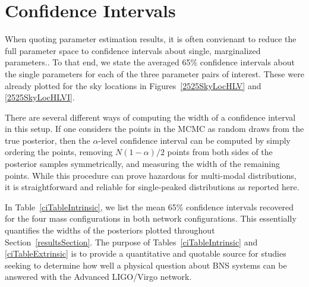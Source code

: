 \documentclass[11pt,a4paper]{emulateapj}
\newcommand{\carl}[1]{{\color{red}  #1}}
\begin{document}

\section{Confidence Intervals}
\label{ciSection}

When quoting parameter estimation results, it is often convienant to reduce the full parameter space to
confidence intervals about single, marginalized parameters..  To that end, we state the averaged 65\% 
confidence intervals about the single parameters for each of the three parameter pairs of interest.  These were already
 plotted for the sky locations in Figures~\ref{2525SkyLocHLV} and \ref{2525SkyLocHLVI}.  

There are several different ways of computing the width of a confidence interval in this setup.  If one considers the points in
 the MCMC as random draws from the true posterior, then the $\alpha$-level confidence interval can be computed by simply
  ordering the points, removing $N(1-\alpha )/2$ points from both sides of the posterior samples symmetrically, and measuring
   the width of the remaining points.  While this procedure can prove hazardous for multi-modal distributions, it is 
   straightforward and reliable for single-peaked distributions as reported here.

In Table~\ref{ciTableIntrinsic}, we list the mean 65\% confidence intervals recovered for the four mass configurations in both 
network configurations. This essentially quantifies the widths of the posteriors plotted throughout Section~\ref{resultsSection}.
  The purpose of Tables~\ref{ciTableIntrinsic} and \ref{ciTableExtrinsic} is to provide a quantitative and quotable source for studies seeking to determine how 
  well a physical question about BNS systems can be answered with the Advanced LIGO/Virgo network.
\end{document}
